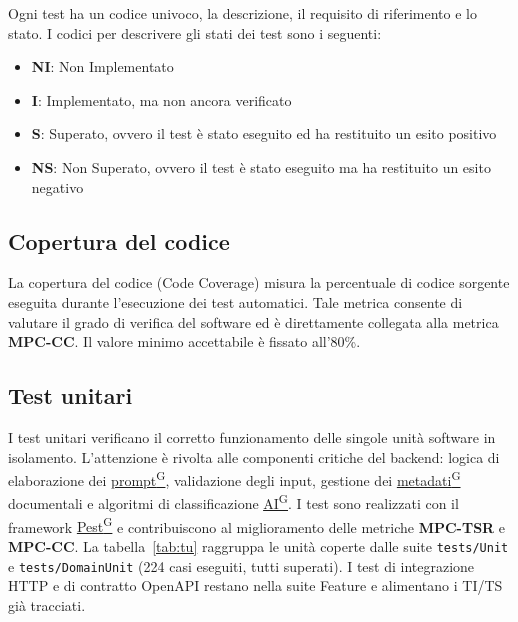 \documentclass[a4paper,12pt]{article}
\providecommand{\glslink}[2]{\href{https://alittlebyte-19.github.io/Documentazione/glossario.html\#gls-#1}{\underline{#2}\textsuperscript{\scriptsize G}}}
\begin{document}
Ogni test ha un codice univoco, la descrizione, il requisito di riferimento e lo stato. I codici per descrivere gli stati dei test sono i seguenti:
\begin{itemize}
    \item \textbf{NI}: Non Implementato
    \item \textbf{I}: Implementato, ma non ancora verificato
    \item \textbf{S}: Superato, ovvero il test è stato eseguito ed ha restituito un esito positivo
    \item \textbf{NS}: Non Superato, ovvero il test è stato eseguito ma ha restituito un esito negativo
\end{itemize}

\subsection{Copertura del codice}
La copertura del codice (Code Coverage) misura la percentuale di codice sorgente eseguita durante l'esecuzione dei test automatici. Tale metrica consente di valutare il grado di verifica del software ed è direttamente collegata alla metrica \textbf{MPC-CC}.
Il valore minimo accettabile è fissato all'80\%.

\subsection{Test unitari}
I test unitari verificano il corretto funzionamento delle singole unità software in isolamento. L'attenzione è rivolta alle componenti critiche del backend: logica di elaborazione dei \glslink{prompt}{prompt}, validazione degli input, gestione dei \glslink{metadati}{metadati} documentali e algoritmi di classificazione \glslink{intelligenza-artificiale-ai}{AI}. I test sono realizzati con il framework \glslink{pest}{Pest} e contribuiscono al miglioramento delle metriche \textbf{MPC-TSR} e \textbf{MPC-CC}. La tabella~\ref{tab:tu} raggruppa le unità coperte dalle suite \texttt{tests/Unit} e \texttt{tests/DomainUnit} (224 casi eseguiti, tutti superati). I test di integrazione HTTP e di contratto OpenAPI restano nella suite Feature e alimentano i TI/TS già tracciati.
\end{document}
